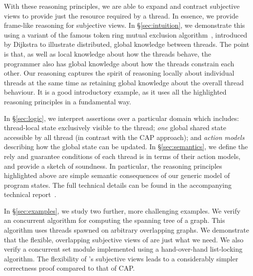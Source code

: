 With these reasoning principles, we are able to expand and contract
subjective views  to provide just the resource required by a thread.
In essence, we provide  frame-like reasoning for  subjective  views. 
In 
\S\ref{sec:intuition}, we 
demonstrate this using 
a variant of the famous  token ring mutual exclusion algorithm~\cite{dijkstra74},
introduced by Dijkstra to illustrate distributed, global knowledge between
threads. The point is that, as well as local knowledge
about how the threads behave, the programmer also has global knowledge
about how the threads constrain each other. Our reasoning captures the
spirit of reasoning locally about individual threads at the same time
as retaining global knowledge about the overall thread behaviour. It
is a good  introductory example, as it uses all the highlighted \colosl
reasoning principles in a fundamental way. 

In \S\ref{sec:logic}, we interpret \colosl assertions
 over a particular domain which includes: thread-local
state exclusively visible to the thread; {\em one} global shared state
accessible by all thread (in contrast with the CAP approach); and {\em
  action models} describing how the global state can be updated.  In
\S\ref{sec:semantics}, we define the rely and guarantee conditions
of each thread is in terms of their action models, and provide a
sketch of soundness. In particular, the
reasoning principles highlighted above are simple semantic
consequences of our generic model of program states.  The full
technical details can
be found 
in the accompanying technical report~\cite{colosl-tr14}.



In \S\ref{sec:examples}, we 
study two further, more challenging examples. We verify an concurrent algorithm for
computing the spanning tree of a graph. This algorithm uses threads
spawned on arbitrary overlapping graphs. We demonstrate that the flexible, overlapping
subjective views of \colosl are just what we need. 
We also verify a concurrent set module
implemented using a hand-over-hand list-locking
algorithm. 
The flexibility of \colosl's subjective views  leads to a
considerably simpler correctness proof compared to that of CAP. 


